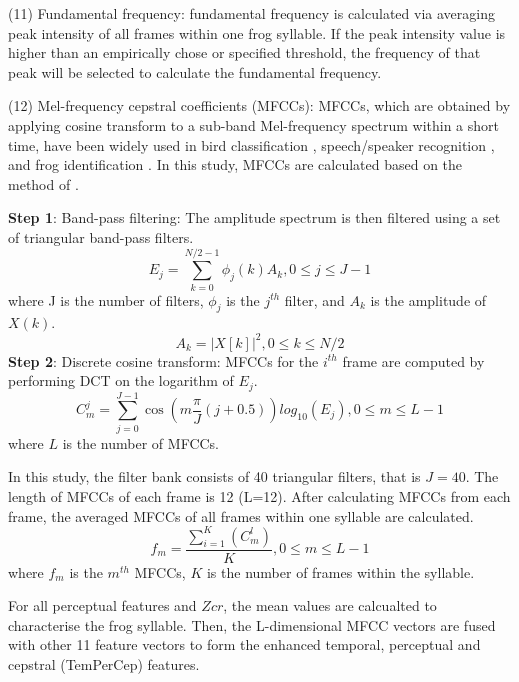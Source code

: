 \vspace{3mm}

\noindent(11) Fundamental frequency: fundamental frequency is calculated via averaging peak intensity of all frames within one frog syllable. If the peak intensity value is higher than an empirically chose or specified threshold, the frequency of that peak will be selected to calculate the fundamental frequency.

\vspace{3mm}

\noindent(12) Mel-frequency cepstral coefficients (MFCCs): MFCCs, which are obtained by applying cosine transform to a sub-band Mel-frequency spectrum within a short time, have been widely used in bird classification \citep{lee2006automatic}, speech/speaker recognition \citep{han2006efficient}, and frog identification \citep{bedoya2014automatic}. In this study, MFCCs are calculated based on the method of \citep{lee2006automatic}. 

\noindent  \textbf{Step 1}: Band-pass filtering: The amplitude spectrum is then filtered using a set of triangular band-pass filters.
\begin{equation}
E_{j}=\sum_{k=0}^{N/2-1}\phi_{j}(k)A_{k}, 0 \leq j \leq J-1
\end{equation}
where J is the number of filters, $\phi_{j}$ is the $j^{th}$ filter, and $A_{k}$ is the amplitude of $X(k)$.
\begin{equation}
A_{k}=|X[k]|^{2}, 0 \leq k \leq N/2
\end{equation}
\noindent  \textbf{Step 2}: Discrete cosine transform: MFCCs for the $i^{th}$ frame are computed by performing DCT on the logarithm of $E_{j}$. 
\begin{equation}
C_{m}^{j} = \sum_{j=0}^{J-1}\cos(m \frac{\pi}{J}(j+0.5))log_{10}(E_{j}), 0 \leq m \leq L-1
\end{equation}
where $L$ is the number of MFCCs.

In this study, the filter bank consists of 40 triangular filters, that is  $J=40$. The length of MFCCs of each frame is 12 (L=12). After calculating MFCCs from each frame, the averaged MFCCs of all frames within one syllable are calculated.
\begin{equation}
f_{m}= \frac{\sum_{i=1}^{K}(C_{m}^{l})}{K}, 0\leq m \leq L-1
\end{equation}
where $f_{m}$ is the $m^{th}$ MFCCs, $K$ is the number of frames within the syllable. 

For all perceptual features and $Zcr$, the mean values are calcualted to characterise the frog syllable. Then, the L-dimensional MFCC vectors are fused with other 11 feature vectors to form the enhanced temporal, perceptual and cepstral (TemPerCep) features.

